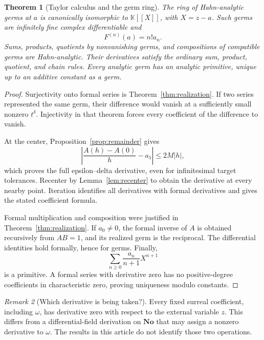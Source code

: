 \documentclass[11pt,a4paper]{article}
\numberwithin{equation}{section}
\newtheorem{theorem}{Theorem}[section]
\theoremstyle{definition}
\theoremstyle{remark}
\newtheorem{remark}[theorem]{Remark}
\newcommand{\No}{\mathbf{No}}
\newcommand{\K}{\mathbb K}
\begin{document}
\begin{theorem}[Taylor calculus and the germ ring]
\label{thm:germs}
The ring of Hahn-analytic germs at $a$ is canonically isomorphic to $\K[[X]]$, with $X=z-a$. Such germs are infinitely fine complex differentiable and
\[
 F^{(n)}(a)=n!a_n.
\]
Sums, products, quotients by nonvanishing germs, and compositions of compatible germs are Hahn-analytic. Their derivatives satisfy the ordinary sum, product, quotient, and chain rules. Every analytic germ has an analytic primitive, unique up to an additive constant as a germ.
\end{theorem}
\begin{proof}
Surjectivity onto formal series is Theorem~\ref{thm:realization}. If two series represented the same germ, their difference would vanish at a sufficiently small nonzero $t^\delta$. Injectivity in that theorem forces every coefficient of the difference to vanish.

At the center, Proposition~\ref{prop:remainder} gives
\[
 \left|\frac{A(h)-A(0)}h-a_1\right|\leq2M|h|,
\]
which proves the full epsilon--delta derivative, even for infinitesimal target tolerances. Recenter by Lemma~\ref{lem:recenter} to obtain the derivative at every nearby point. Iteration identifies all derivatives with formal derivatives and gives the stated coefficient formula.

Formal multiplication and composition were justified in Theorem~\ref{thm:realization}. If $a_0\ne0$, the formal inverse of $A$ is obtained recursively from $AB=1$, and its realized germ is the reciprocal. The differential identities hold formally, hence for germs. Finally,
\[
 \sum_{n\geq0}\frac{a_n}{n+1}X^{n+1}
\]
is a primitive. A formal series with derivative zero has no positive-degree coefficients in characteristic zero, proving uniqueness modulo constants.
\end{proof}

\begin{remark}[Which derivative is being taken?]
Every fixed surreal coefficient, including $\omega$, has derivative zero with respect to the external variable $z$. This differs from a differential-field derivation on $\No$ that may assign a nonzero derivative to $\omega$. The results in this article do not identify those two operations.
\end{remark}
\end{document}
